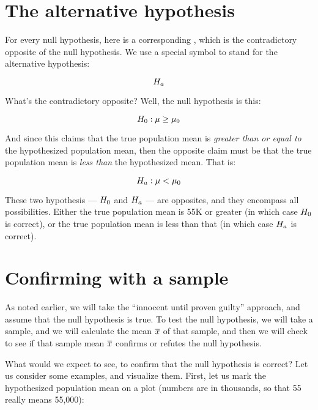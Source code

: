 \documentclass[../../../main.tex]{subfiles}
\begin{document}
\section{The alternative hypothesis}

For every null hypothesis, here is a corresponding , which is the contradictory opposite of the null hypothesis. We use a special symbol to stand for the alternative hypothesis:

\begin{equation*}
  \AltHyp/
\end{equation*}

\noindent
What's the contradictory opposite? Well, the null hypothesis is this:

\begin{equation*}
  \NullHyp/: \populationmean \geq \HypPopMean/
\end{equation*}

\noindent
And since this claims that the true population mean is \emph{greater than or equal to} the hypothesized population mean, then the opposite claim must be that the true population mean is \emph{less than} the hypothesized mean. That is:

\begin{equation*}
  \AltHyp/: \populationmean < \HypPopMean/
\end{equation*}

\noindent
These two hypothesis --- $\NullHyp/$ and $\AltHyp/$ --- are opposites, and they encompass all possibilities. Either the true population mean is 55K or greater (in which case $\NullHyp/$ is correct), or the true population mean is less than that (in which case $\AltHyp/$ is correct).


\section{Confirming with a sample}

As noted earlier, we will take the ``innocent until proven guilty'' approach, and assume that the null hypothesis is true. To test the null hypothesis, we will take a sample, and we will calculate the mean $\overline{x}$ of that sample, and then we will check to see if that sample mean $\overline{x}$ confirms or refutes the null hypothesis. 

What would we expect to see, to confirm that the null hypothesis is correct? Let us consider some examples, and visualize them. First, let us mark the hypothesized population mean on a plot (numbers are in thousands, so that 55 really means 55,000):
\end{document}
